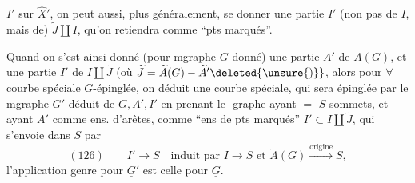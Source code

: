 $I'$ sur $\widehat X'$, on peut aussi, plus généralement, se donner une partie $I'$ (non pas de $I$, mais de) $\widetilde J\amalg I$, qu'on retiendra comme ``pts marqués''.

Quand on s'est ainsi donné (pour  mgraphe $\underline G$ donné) une partie $A'$ de $A(G)$, et une partie $I'$ de $I\amalg\widetilde J$ (où $\widetilde J=\widetilde A(G)-\widetilde A'\deleted{\unsure{)}}$, alors pour $\forall$ courbe spéciale $G$-épinglée, on déduit une courbe spéciale, qui sera épinglée par le mgraphe $\underline G'$ déduit de $\underline G,A',I'$ en prenant le -graphe  ayant $=$ $S$ sommets, et ayant $A'$ comme ens. d'arêtes,  comme ``ens de pts marqués'' $I'\subset I\amalg\widetilde J$, qui s'envoie dans $S$  par
\[
(126)\qquad I'\longrightarrow S\quad\text{induit par }I\longrightarrow S\text{ et }\widetilde A(G)\xrightarrow{\text{origine}}S,
\]
l'application genre pour $\underline G'$ est celle pour $\underline G$.
